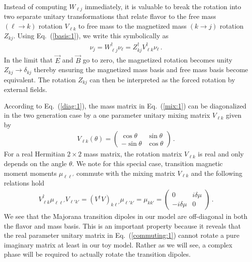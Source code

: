 \documentclass[addchapnum]{ws-rv961x669} %
\newcommand{\req}[1]{Eq.~(\ref{#1})}
\begin{document}
Instead of computing $W_{\ell j}$ immediately, it is valuable to break the rotation into two separate unitary transformations that relate flavor to the free mass $(\ell\rightarrow k)$ rotation $V_{\ell k}$ to free mass to the magnetized mass $(k\rightarrow j)$ rotation $Z_{kj}$. Using \req{basis:1}, we write this symbolically as
\begin{align}
    \label{zrot:1}
    \nu_{j} = W^{\dag}_{\ell j}\nu_{\ell} = Z_{kj}^{\dag}V_{\ell k}^{\dag}\nu_{\ell}\,.
\end{align}
In the limit that $\vec{E}$ and $\vec{B}$ go to zero, the magnetized rotation becomes unity $Z_{kj}\rightarrow\delta_{kj}$ thereby ensuring the magnetized mass basis and free mass basis become equivalent. The rotation $Z_{kj}$ can then be interpreted as the forced rotation by external fields.

According to \req{diag:1}, the mass matrix in \req{mix:1} can be diagonalized in the two generation case by a one parameter unitary mixing matrix $V_{\ell k}$ given by
\begin{align}
    \label{rot:1}
    V_{\ell k}(\theta)=
    \begin{pmatrix}
        \cos\theta & \sin\theta\\
        -\sin\theta & \cos\theta
    \end{pmatrix}\,.
\end{align}
For a real Hermitian $2\times 2$ mass matrix, the rotation matrix $V_{\ell k}$ is real and only depends on the angle $\theta$. We note for this special case, transition magnetic moment moments $\mu_{\ell\ell'}$ commute with the mixing matrix $V_{\ell k}$ and the following relations hold
\begin{align}
    \label{commuting:1}
    V_{\ell k}^{\dag}\mu_{\ell\ell'}V_{\ell' k'}=(V^{\dag}V)_{k\ell'}\mu_{\ell'k'}=\mu_{kk'}=
    \begin{pmatrix}
        0 & i\delta\mu\\
        -i\delta\mu & 0
    \end{pmatrix}\,.
\end{align}
We see that the Majorana transition dipoles in our model are off-diagonal in both the flavor and mass basis. This is an important property because it reveals that the real parameter unitary matrix in \req{commuting:1} cannot rotate a pure imaginary matrix at least in our toy model. Rather as we will see, a complex phase will be required to actually rotate the transition dipoles.
\end{document}
